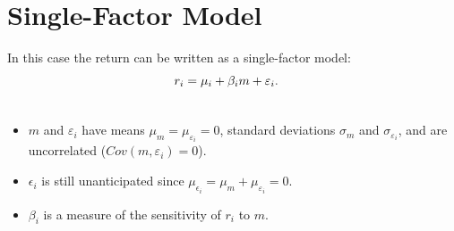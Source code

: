\documentclass[letterpaper,10pt,english]{sphinxmanual}
\begin{document}
\section{Single-Factor Model}
\label{indexModels:id2}
In this case the return can be written as a single-factor model:
\label{indexModels:equation-sfm}\begin{gather}
\begin{split}r_i & = \mu_i + \beta_i m + \varepsilon_i.\end{split}\label{indexModels-sfm}\\\begin{split}\end{split}\notag
\end{gather}\begin{itemize}
\item {} 
$m$ and $\varepsilon_i$ have means $\mu_m = \mu_{\varepsilon_i}
= 0$, standard deviations $\sigma_m$ and
$\sigma_{\varepsilon_i}$, and are uncorrelated ($Cov(m, \varepsilon_i) = 0$).

\end{itemize}
\begin{itemize}
\item {} 
$\epsilon_i$ is still unanticipated since $\mu_{\epsilon_i} = \mu_m + \mu_{\varepsilon_i} = 0$.

\end{itemize}
\begin{itemize}
\item {} 
$\beta_i$ is a measure of the sensitivity of $r_i$ to $m$.

\end{itemize}
\end{document}
